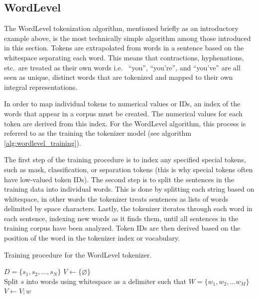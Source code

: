 \documentclass[12pt]{article}
\begin{document}
\subsection{WordLevel}\label{sec:wordlevel}
The WordLevel \cite{wolf_transformers_2020} tokenization algorithm, mentioned briefly as an introductory example above, is the most technically simple
algorithm among those introduced in this section. Tokens are extrapolated from words in a sentence based on the whitespace separating each word.
This means that contractions, hyphenations, etc.~are treated as their own words i.e.~ ``you'', ``you're'', and ``you've'' are all seen as unique,
distinct words that are tokenized and mapped to their own integral representations.

In order to map individual tokens to numerical values or IDs, an index of the words that appear in a corpus must be created. The numerical values for
each token are derived from this index. For the WordLevel algorithm, this process is referred to as the training the tokenizer model (see algorithm
\ref{alg:wordlevel_training}).

The first step of the training procedure is to index any specified special tokens, such as mask, classification, or separation tokens (this is why
special tokens often have low-valued token IDs). The second step is to split the sentences in the training data into individual words. This is done
by splitting each string based on whitespace, in other words the tokenizer treats sentences as lists of words delimited by space characters. Lastly,
the tokenizer iterates through each word in each sentence, indexing new words as it finds them, until all sentences in the training corpus have been
analyzed. Token IDs are then derived based on the position of the word in the tokenizer index or vocabulary.

\begin{algorithm}[!t]
    \caption{Training procedure for the WordLevel tokenizer.}
    \label{alg:wordlevel_training}
    \begin{algorithmic}
        \State $D = \{s_1, s_2, ..., s_N\}$
        \State $V \gets \{\varnothing\}$
        \\

        \State Split $s$ into words using whitespace as a delimiter such that
        \State $W=\{w_1, w_2, ... w_M\}$
        \\

        \State $V \gets V;w$
        \EndIf
        \EndFor
        \EndFor
    \end{algorithmic}
\end{algorithm}
\end{document}
